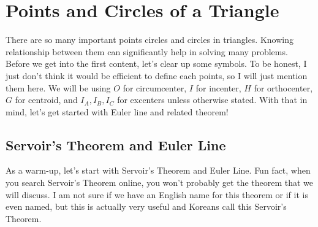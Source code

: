 \documentclass[../../main.tex]{subfiles}
\begin{document}
\section{Points and Circles of a Triangle}

There are so many important points circles and circles in triangles.
Knowing relationship between them can significantly help in solving
many problems. Before we get into the first content, let's clear
up some symbols. To be honest, I just don't think it would be
efficient to define each points, so I will just mention them here.
We will be using $O$ for circumcenter, $I$ for incenter, $H$ for
orthocenter, $G$ for centroid, and $I_A, I_B, I_C$ for excenters
unless otherwise stated. With that in mind, let's get started with
Euler line and related theorem!

\subsection{Servoir's Theorem and Euler Line}

As a warm-up, let's start with Servoir's Theorem and Euler Line.
Fun fact, when you search Servoir's Theorem online, you won't
probably get the theorem that we will discuss. I am not sure if
we have an English name for this theorem or if it is even named,
but this is actually very useful and Koreans call this Servoir's
Theorem.
\end{document}
